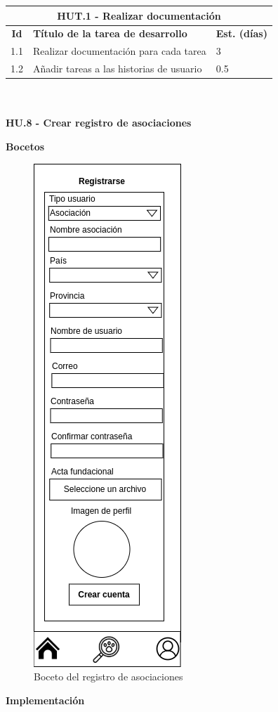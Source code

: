 \begin{tabular}{|c|p{9.5cm}|p{1cm}|}
	\hline
	\multicolumn{3}{|c|}{\textbf{HUT.1 - Realizar documentación}} \\
	\hline
	\textbf{Id} & \textbf{Título de la tarea de desarrollo} & \textbf{Est. (días)} \\
	\hline
	1.1 & Realizar documentación para cada tarea & 3 \\ \hline
	1.2 &  Añadir tareas a las historias de usuario & 0.5 \\ \hline
\end{tabular} \\ \\

\Large{\textbf{HU.8 - Crear registro de asociaciones}}

\textbf{Bocetos} \\
\begin{figure}[H]
	\centering
	\includegraphics[width=0.31\linewidth]{sprint 3//hu8/registro_asociaciones.png}
	\caption{Boceto del registro de asociaciones}
	\label{fig:boceto_regAso}
\end{figure}

\textbf{Implementación}

